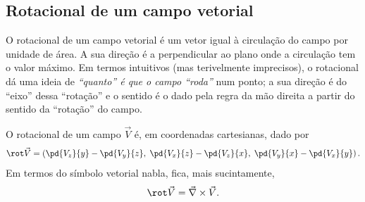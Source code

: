 \subsection*{Rotacional de um campo vetorial}
O rotacional de um campo vetorial é um vetor igual à circulação do campo por
unidade de área. A sua direção é a perpendicular ao plano onde a circulação tem
o valor máximo. Em termos intuitivos (mas terivelmente imprecisos), o rotacional
dá uma ideia de \emph{``quanto'' é que o campo ``roda''} num ponto; a sua
direção é do ``eixo'' dessa ``rotação'' e o sentido é o dado pela regra da mão
direita a partir do sentido da ``rotação'' do campo. 

O rotacional de um campo $\vec V$ é, em coordenadas cartesianas, dado por
\begin{equation}\label{eq:rotcart}
  \rot\vec V=
  \left(\pd{V_z}{y}-\pd{V_y}{z},\; \pd{V_x}{z}-\pd{V_z}{x},\;
  \pd{V_y}{x}-\pd{V_x}{y}\right).
\end{equation}
Em termos do símbolo vetorial nabla, fica, mais sucintamente,
\begin{equation}
  \rot\vec V=\vec\nabla\times\vec V.
\end{equation}

